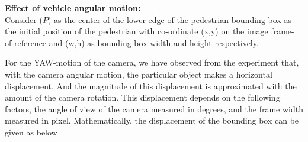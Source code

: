 



\textbf{Effect of vehicle angular motion:} \\
Consider ($P$) as the center of the lower edge of the pedestrian bounding box as the initial position of the pedestrian with co-ordinate (x,y) on the image frame-of-reference and (w,h) as bounding box width and height respectively.




For the YAW-motion of the camera, we have observed from the experiment that, with the camera angular motion, the particular object makes a horizontal displacement. And the magnitude of this displacement is approximated with the amount of the camera rotation. This displacement depends on the following factors, the angle of view of the camera measured in degrees, and the frame width measured in pixel. Mathematically, the displacement of the bounding box can be given as below

